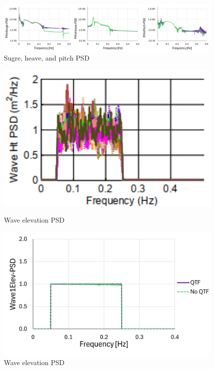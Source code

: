 \documentclass[a4paper, 11pt]{article}
\begin{document}
\begin{figure}[H]
    \centering
    \includegraphics[width=1\textwidth]{sur_hea_pit_psd.png}
    \caption{\small Sugre, heave, and pitch PSD}
    \label{fig:s_h_p_p_mine}
\end{figure}

\begin{figure}[H]
    \begin{minipage}{0.48\textwidth}
        \centering
        \includegraphics[width=1\textwidth]{2.6_wave.png}
        \caption{\small Wave elevation PSD \cite{Robertson2014}} 
        \label{fig:2.6_wave}
    \end{minipage}
    \hfill
    \begin{minipage}{0.51\textwidth}
        \centering
        \vspace{-0.3cm}
        \includegraphics[width=1\textwidth]{2.6_wave_mine.png}
        \caption{\small Wave elevation PSD}
        \label{fig:2.6_wave_mine}
    \end{minipage}
\end{figure}
\end{document}
